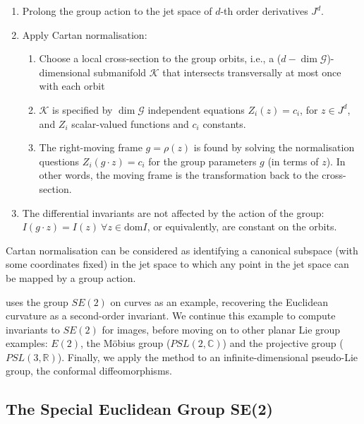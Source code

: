\documentclass{artjlt}
\begin{document}
\begin{enumerate}
\item Prolong the group action to the jet space of $d$-th order derivatives $J^d$.
\item Apply Cartan normalisation:
    \begin{enumerate}
    \item Choose a local cross-section to the group orbits, i.e., a ($d - \dim \mathcal{G}$)-dimensional submanifold $\mathcal{K}$ that intersects transversally at most once with each orbit
    \item $\mathcal{K}$ is specified by $\dim \mathcal{G}$ independent equations $Z_i (z) = c_i$, for $z \in J^d$,  and $Z_i$ scalar-valued functions and $c_i$ constants.
    \item The right-moving frame $g = \rho(z)$ is found by solving the normalisation questions $Z_i (g \cdot z) = c_i$ for the group parameters $g$ (in terms of $z$). In other words, the moving frame is the transformation back to the cross-section.
    \end{enumerate}
\item The differential invariants are not affected by the action of the group: $I(g \cdot z) = I(z) \: \forall z \in \mathrm{dom} I$, or equivalently, are constant on the orbits. 
\end{enumerate}

Cartan normalisation can be considered as identifying a canonical subspace (with some coordinates fixed) in the jet space to which any point in the jet space can be mapped by a group action.

\citet{OlverCIT} uses the group $SE(2)$ on curves as an example, recovering the Euclidean curvature as a second-order invariant. We continue this example to compute invariants to $SE(2)$ for images, before moving on to other planar Lie group examples: $E(2)$, the M\"obius group ($PSL(2,\mathbb{C})$) and the projective group ($PSL(3,\mathbb{R})$). Finally, we apply the method to an infinite-dimensional pseudo-Lie group, the conformal diffeomorphisms.

\subsection{The Special Euclidean Group SE(2)}
\label{sec:SE2}
\end{document}
